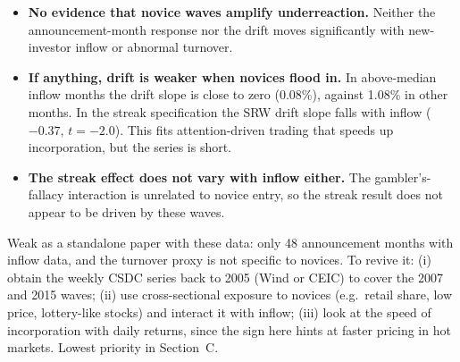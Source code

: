 \begin{itemize}
\item \textbf{No evidence that novice waves amplify underreaction.} Neither the announcement-month response nor the
  drift moves significantly with new-investor inflow or abnormal turnover.
\item \textbf{If anything, drift is weaker when novices flood in.} In above-median inflow months the drift slope is
  close to zero (0.08\%), against 1.08\% in other months. In the streak specification the SRW drift slope falls with
  inflow ($-0.37$, $t=-2.0$). This fits attention-driven trading that speeds up incorporation, but the series is short.
\item \textbf{The streak effect does not vary with inflow either.} The gambler's-fallacy interaction is unrelated to
  novice entry, so the streak result does not appear to be driven by these waves.
\end{itemize}

Weak as a standalone paper with these data: only 48 announcement months with inflow data, and the turnover proxy is
not specific to novices. To revive it: (i) obtain the weekly CSDC series back to 2005 (Wind or CEIC) to cover the
2007 and 2015 waves; (ii) use cross-sectional exposure to novices (e.g.\ retail share, low price, lottery-like
stocks) and interact it with inflow; (iii) look at the speed of incorporation with daily returns, since the sign
here hints at faster pricing in hot markets. Lowest priority in Section~C.

